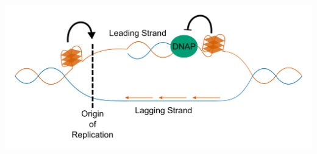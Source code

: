 \documentclass[12pt,a4paper,]{report}
\let\origfigure=\figure
\let\endorigfigure=\endfigure
\renewenvironment{figure}[1][2] {
    \expandafter\origfigure\expandafter[H]
} {
    \endorigfigure
}
\begin{document}
\begin{figure}[htbp]
\centering
\includegraphics[width=\textwidth,height=562pt,keepaspectratio]{introduction/figures/replication.png}
\caption[Role of G4s in DNA replication]{\textbf{Role   of   G4s   in   DNA   replication}   Illustration   showing   the   possible   mechanisms   of   G4   involvement   in   DNA   replication.   Besnard   et   al. identified   that   a   majority   of   human   replication   origins   contain   a   PG4,   suggesting   that   G4s   may   recruit   replication   machinery   (Besnard   et   al.,   2012).   In   the   absence   of   G4   unwinding   helicase   FANCJ,   Kruisselbrink   et   al. identified   deletions   downstream   of   PG4   loci,   suggesting   G4s   cause   replication   fork   collapse.   \label{replic}}
\end{figure}
\end{document}
